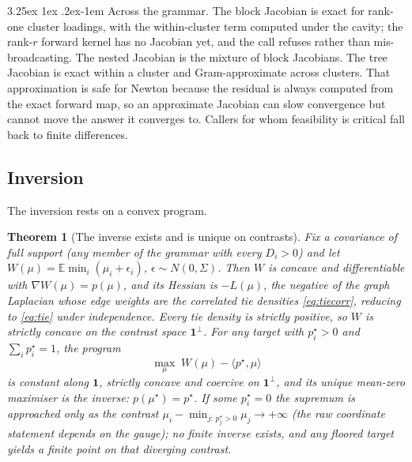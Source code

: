 \documentclass[11pt]{article}
\makeatletter
\renewcommand\paragraph{\@startsection{paragraph}{4}{\z@}%
  {3.25ex \@plus1ex \@minus.2ex}{-1em}%
  {\normalfont\normalsize\itshape}}
\newtheorem{theorem}{Theorem}
\newcommand{\E}{\mathbb{E}}
\makeatother
\begin{document}
\paragraph{Across the grammar.} The block Jacobian is exact for
rank-one cluster loadings, with the within-cluster term computed under
the cavity; the rank-$r$ forward kernel has no Jacobian yet, and the
call refuses rather than mis-broadcasting. The nested Jacobian is the
mixture of block Jacobians. The tree Jacobian is exact within a cluster
and Gram-approximate across clusters. That approximation is safe for
Newton because the residual is always computed from the exact forward
map, so an approximate Jacobian can slow convergence but cannot move the
answer it converges to. Callers for whom feasibility is critical fall
back to finite differences.

\subsection{Inversion}

The inversion rests on a convex program.

\begin{theorem}[The inverse exists and is unique on contrasts]\label{thm:inverse}
Fix a covariance of full support (any member of the grammar with every
$D_i>0$) and let $W(\mu)=\E\min_i(\mu_i+\epsilon_i)$,
$\epsilon\sim N(0,\Sigma)$. Then $W$ is concave and differentiable with
$\nabla W(\mu)=p(\mu)$, and its Hessian is $-L(\mu)$, the negative of the
graph Laplacian whose edge weights are the correlated tie densities
\eqref{eq:tiecorr}, reducing to \eqref{eq:tie} under independence.
Every tie density is strictly positive, so $W$ is strictly concave on the
contrast space $\mathbf{1}^{\perp}$. For any target with $p^{\star}_i>0$
and $\sum_i p^{\star}_i=1$, the program
\[
\max_{\mu}\; W(\mu)-\langle p^{\star},\mu\rangle
\]
is constant along $\mathbf{1}$, strictly concave and coercive on
$\mathbf{1}^{\perp}$, and its unique mean-zero maximiser is the inverse:
$p(\mu^{\star})=p^{\star}$. If some $p^{\star}_i=0$ the supremum is
approached only as the contrast
$\mu_i-\min_{j:\,p^{\star}_j>0}\mu_j\to+\infty$ (the raw coordinate
statement depends on the gauge); no finite inverse exists, and any
floored target yields a finite point on that diverging contrast.
\end{theorem}
\end{document}
